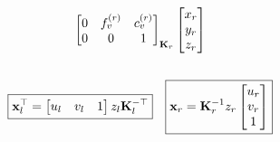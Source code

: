 \begin{frame}
\begin{columns}[T]
\begin{column}{0.5\textwidth}
\begin{align*}
{\begin{bmatrix}
                    0 & f_v^{(r)} & c_v^{(r)} \\
                    0 & 0 & 1
                \end{bmatrix}}_{\boldsymbol{\mathbf{K}}_r}
                \begin{bmatrix} x_r \\ y_r \\ z_r \end{bmatrix}
            \end{align*}
        \end{column}
    \end{columns}
    \vspace*{-0.5em}
    \begin{equation*}
        \boxed{
            \mathbf{x}_l^{\top} = \begin{bmatrix} u_l & v_l & 1 \end{bmatrix} z_l \boldsymbol{\mathbf{K}}_l^{-\top}
        }
        \quad
        \boxed{
        \mathbf{x}_r = \boldsymbol{\mathbf{K}}_r^{-1} z_r \begin{bmatrix} u_r \\ v_r \\ 1 \end{bmatrix}
        }
    \end{equation*}
\end{frame}

